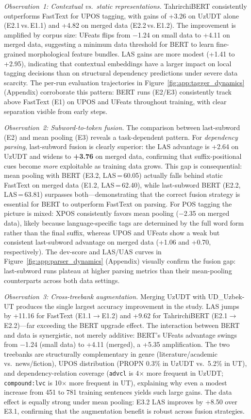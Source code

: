 \documentclass[runningheads]{llncs}
\begin{document}
\textit{Observation~1: Contextual vs.\ static representations.}
TahrirchiBERT consistently outperforms FastText for UPOS tagging, with gains of +3.26 on UzUDT alone (E2.1\,vs.\,E1.1) and +4.82 on merged data (E2.2\,vs.\,E1.2).
The improvement is amplified by corpus size: UFeats flips from $-$1.24 on small data to +4.11 on merged data, suggesting a minimum data threshold for BERT to learn fine-grained morphological feature bundles.
LAS gains are more modest (+1.41 to +2.95), indicating that contextual embeddings have a larger impact on local tagging decisions than on structural dependency predictions under severe data scarcity.
The per-run evaluation trajectories in Figure~\ref{fig:app:tagger_dynamics} (Appendix) corroborate this pattern: BERT runs (E2/E3) consistently track above FastText (E1) on UPOS and UFeats throughout training, with clear separation visible from early steps.

\textit{Observation~2: Subword-to-token fusion.}
The comparison between last-subword (E2) and mean pooling (E3) reveals a task-dependent pattern.
For \emph{dependency parsing}, last-subword fusion is clearly superior: the LAS advantage is +2.64 on UzUDT and widens to \textbf{+3.76} on merged data, confirming that suffix-positional cues become \emph{more} exploitable as training data grows.
This gap is consequential: mean pooling with BERT (E3.2, LAS\,=\,60.05) actually falls behind static FastText on merged data (E1.2, LAS\,=\,62.40), while last-subword BERT (E2.2, LAS\,=\,63.81) surpasses both---demonstrating that the correct fusion strategy is essential for BERT to outperform FastText on parsing.
For POS tagging the picture is mixed: XPOS consistently favors mean pooling ($-$2.35 on merged data), likely because language-specific tags are determined by the full word form rather than the final suffix, whereas UPOS and UFeats show a weak but consistent last-subword advantage on merged data (+1.06 and +0.70, respectively).
The dev-score and LAS/UAS curves in Figure~\ref{fig:app:parser_dynamics} (Appendix) visually confirm the fusion gap: last-subword runs plateau at higher parsing metrics than their mean-pooling counterparts across both data settings.

\textit{Observation~3: Cross-treebank augmentation.}
Merging UzUDT with UD\_Uzbek-UT produces the single largest accuracy improvement in the study.
LAS jumps by +11.16 for FastText (E1.1$\to$E1.2) and +9.62 for TahrirchiBERT (E2.1$\to$E2.2)---far exceeding the BERT upgrade effect.
The interaction between BERT and data is synergistic, not merely additive: BERT's UFeats advantage swings from $-$1.24 (small data) to +4.11 (merged), a +5.35 amplification.
The two treebanks are structurally complementary in genre (literature/academic vs.\ news/fiction), UPOS distribution (PROPN 0.3\% in UzUDT vs.\ 5.2\% in UT), and dependency-relation coverage (\texttt{advcl} is 4$\times$ more frequent in UzUDT; \texttt{compound:lvc} is 10$\times$ more frequent in UT), explaining why even a modest increase from 451 to 781 training sentences yields such large gains.
The data effect is equally strong under mean pooling: E3.2 LAS improves by +8.50 over E3.1, confirming that the augmentation benefit is robust across fusion strategies.
\end{document}
